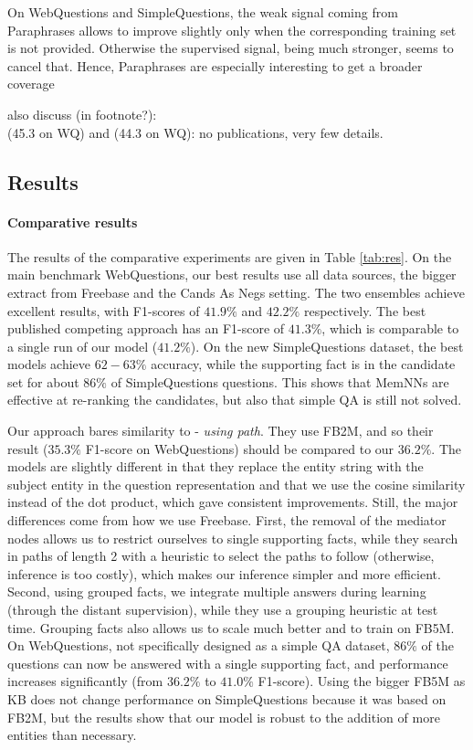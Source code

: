 \documentclass[11pt,a4paper]{article}
\newcommand{\fb}{{\sf Freebase}\xspace}
\newcommand{\wq}{{\sf WebQuestions}\xspace}
\newcommand{\fbq}{{\sf SimpleQuestions}\xspace}
\newcommand{\fbs}{{\sf FB2M}\xspace}
\newcommand{\fbb}{{\sf FB5M}\xspace}
\newcommand{\prp}{{\sf Paraphrases}\xspace}
\begin{document}
On \wq and \fbq, the weak signal coming from \prp allows to
  improve slightly only when the corresponding training set is not
  provided. Otherwise the supervised signal, being much stronger,
  seems to cancel that. Hence, \prp are especially interesting to get
  a broader coverage

also discuss (in footnote?):\\
\cite{wang2014overview} (45.3 on WQ) and
\cite{yao-scratch-qa-naacl2015} (44.3 on WQ): no publications, very
few details.
\fi

\subsection{Results}

\paragraph{Comparative results}
The results of the comparative experiments are given in Table
\ref{tab:res}. 
On the main benchmark \wq, our best results use all data sources, the
bigger extract from \fb and the {\sc Cands As Negs} setting. The two
ensembles achieve excellent results, with F1-scores of $41.9\%$
and $42.2\%$ respectively. The best published competing approach
\cite{yang2014joint} has an F1-score of $41.3\%$, which is comparable
to a single run of our model ($41.2\%$). On the new \fbq dataset, the
best models achieve $62-63\%$ accuracy, while the supporting fact is
in the candidate set for about $86\%$ of \fbq questions. This shows
that MemNNs are effective at re-ranking the candidates, but also that
simple QA is still not solved.



Our approach bares similarity to
\cite{bordes-chopra-weston:2014:EMNLP2014} - {\it using path}. They
use \fbs, and so their result ($35.3\%$ F1-score on \wq) should be
compared to our $36.2\%$. The models are slightly different in that
they replace the entity string with the subject entity in the question
representation and that we use the cosine similarity instead of the
dot product, which gave consistent improvements. Still, the major
differences come from how we use \fb. First, the removal of the
mediator nodes allows us to restrict ourselves to single supporting
facts, while they search in paths of length 2 with a heuristic to
select the paths to follow (otherwise, inference is too costly), which
makes our inference simpler and more efficient. Second, using grouped
facts, we integrate multiple answers during learning (through the
distant supervision), while they use a grouping heuristic at test
time. Grouping facts also allows us to scale much better and to train
on \fbb. On \wq, not specifically designed as a simple QA dataset,
$86\%$ of the questions can now be answered with a single supporting
fact, and performance increases significantly (from $36.2\%$ to
$41.0\%$ F1-score). Using the bigger \fbb as KB does not change performance on \fbq
because it was based on \fbs, but the results show that our model is
robust to the addition of more entities than necessary.
\end{document}

